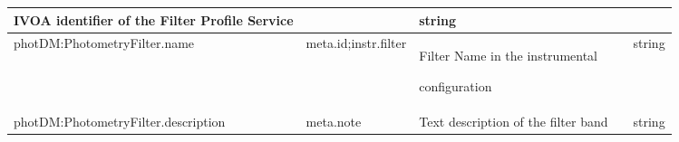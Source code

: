 \documentclass[11pt,a4paper]{ivoa}
\begin{document}
\begin{appendices}
\begin{table}[H]
\begin{adjustbox}{angle=90}
\begin{tabular}{p{7in}p{0.87in}p{0.91in}p{0.4in}p{0.25in}}
\multicolumn{1}{p{0.91in}}{{\fontsize{10pt}{12.0pt}\selectfont IVOA identifier of the Filter Profile Service}} &
\multicolumn{1}{p{0.74in}}{} &
\multicolumn{1}{p{0.35in}}{{\fontsize{10pt}{12.0pt}\selectfont string}} \\
\hline
\multicolumn{1}{p{5in}}{{\fontsize{10pt}{12.0pt}\selectfont photDM:PhotometryFilter.name}} &
\multicolumn{1}{p{0.87in}}{{\fontsize{10pt}{12.0pt}\selectfont meta.id;instr.filter }} &
\multicolumn{1}{p{0.91in}}{{\fontsize{10pt}{12.0pt}\selectfont Filter Name in the instrumental } \par {\fontsize{10pt}{12.0pt}\selectfont configuration\  }} &
\multicolumn{1}{p{0.74in}}{} &
\multicolumn{1}{p{0.35in}}{{\fontsize{10pt}{12.0pt}\selectfont string}} \\
\hline
\multicolumn{1}{p{5in}}{{\fontsize{10pt}{12.0pt}\selectfont photDM:PhotometryFilter.description}} &
\multicolumn{1}{p{0.87in}}{{\fontsize{10pt}{12.0pt}\selectfont meta.note }} &
\multicolumn{1}{p{0.91in}}{{\fontsize{10pt}{12.0pt}\selectfont Text description of the filter band}} &
\multicolumn{1}{p{0.74in}}{} &
\multicolumn{1}{p{0.35in}}{{\fontsize{10pt}{12.0pt}\selectfont string}} \\
\hline

\end{tabular}
\end{adjustbox}
 \end{table}





\newpage




\end{appendices}
\end{document}
